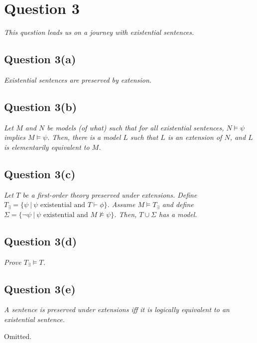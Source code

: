 \documentclass[a4paper]{article}
\begin{document}
\section*{Question 3}
\begin{center}
  \textit{This question leads us on a journey with existential sentences.}
\end{center}
\subsection*{Question 3(a)}
\begin{center}
  \textit{Existential sentences are preserved by extension.}
\end{center}
\subsection*{Question 3(b)}
\begin{center}
  \textit{Let $M$ and $N$ be models (of what) such that for all existential sentences, $N \models \psi$ implies $M \models \psi$.
  Then, there is a model $L$ such that $L$ is an extension of $N$, and $L$ is elementarily equivalent to $M$.}
\end{center}
\subsection*{Question 3(c)}
\begin{center}
  \textit{Let $T$ be a first-order theory preserved under extensions. Define
    $T_\exists = \{\psi ~|~ \psi\text{ existential and } T \vdash \phi\}$.
    Assume $M \models T_\exists$ and define $\Sigma = \{ \neg \psi ~|~ \psi\text{ existential and }M \nvDash \psi\}$. Then, $T \cup \Sigma$ has a model.
  }
\end{center}
\subsection*{Question 3(d)}
\begin{center}
  \textit{Prove $T_\exists \models T$.}
\end{center}
\subsection*{Question 3(e)}
\begin{center}
  \textit{A sentence is preserved under extensions iff
  it is logically equivalent to an existential sentence.}
\end{center}
Omitted.
\end{document}
